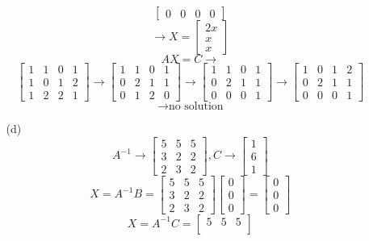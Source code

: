 \begin{itemize}
\begin{itemize}
$$\begin{bmatrix}
0 & 0 & 0 & 0
\end{bmatrix}$$
$$\rightarrow X = \begin{bmatrix}
2x \\
x \\
x
\end{bmatrix}$$
$$AX = C \rightarrow $$
$$\begin{bmatrix}
1 & 1 & 0 & 1 \\
1 & 0 & 1 & 2 \\
1 & 2 & 2 & 1
\end{bmatrix} \rightarrow \begin{bmatrix}
1 & 1 & 0 & 1 \\
0 & 2 & 1 & 1 \\
0 & 1 & 2 & 0
\end{bmatrix} \rightarrow \begin{bmatrix}
1 & 1 & 0 & 1 \\
0 & 2 & 1 & 1 \\
0 & 0 & 0 & 1
\end{bmatrix} \rightarrow \begin{bmatrix}
1 & 0 & 1 & 2 \\
0 & 2 & 1 & 1 \\
0 & 0 & 0 & 1
\end{bmatrix}$$
$$\rightarrow \text{no solution}$$
\item[(d)]
$$A^{-1} \rightarrow \begin{bmatrix}
5 & 5 & 5 \\
3 & 2 & 2 \\
2 & 3 & 2
\end{bmatrix}, C \rightarrow \begin{bmatrix}
1 \\
6 \\
1
\end{bmatrix}$$
$$X = A^{-1}B = \begin{bmatrix}
5 & 5 & 5 \\
3 & 2 & 2 \\
2 & 3 & 2
\end{bmatrix}\begin{bmatrix}
0 \\
0 \\
0
\end{bmatrix} = \begin{bmatrix}
0 \\
0 \\
0
\end{bmatrix}$$
$$X = A^{-1}C = \begin{bmatrix}
5 & 5 & 5 \\

\end{bmatrix}$$
\end{itemize}
\end{itemize}
